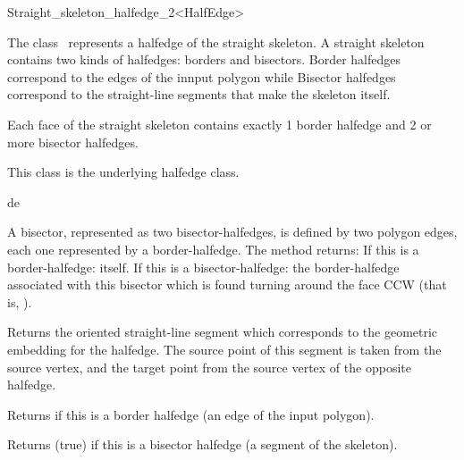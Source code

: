 \begin{ccRefClass} {Straight_skeleton_halfedge_2<HalfEdge>}

\ccDefinition

The class \ccClassTemplateName\ represents a halfedge of the straight skeleton.
A straight skeleton contains two kinds of halfedges: borders and bisectors. Border halfedges correspond to the edges of the innput polygon while Bisector halfedges correspond to the straight-line segments that make the skeleton itself.

Each face of the straight skeleton contains exactly 1 border halfedge and 2 or more bisector halfedges.
\ccInheritsFrom


This class is the underlying halfedge class.

\ccTypes

\ccThreeToTwo


\ccCreation
{}

{de}




\ccOperations



{A bisector, represented as two bisector-halfedges, is defined by two polygon edges, each one represented by a border-halfedge.
The method returns:
If this is a border-halfedge: itself.
If this is a bisector-halfedge: the border-halfedge associated with this bisector which is found turning around the face CCW (that is, ). }

{Returns the oriented straight-line segment which corresponds to the geometric embedding for the halfedge. The source point of this segment is taken from the source vertex, and the target point from the source vertex of the opposite halfedge.}

{Returns  if this is a border halfedge (an edge of the input polygon).}

{Returns \ccc(true) if this is a bisector halfedge (a segment of the skeleton).} 
\end{ccRefClass}

